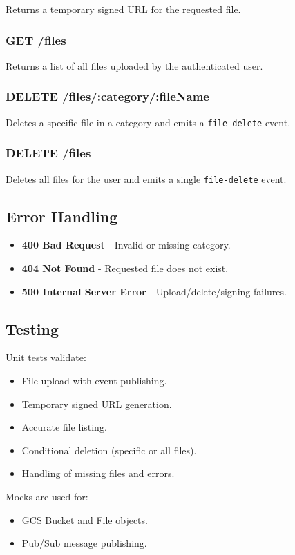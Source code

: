 Returns a temporary signed URL for the requested file.

\subsubsection*{GET /files}

Returns a list of all files uploaded by the authenticated user.

\subsubsection*{DELETE /files/:category/:fileName}

Deletes a specific file in a category and emits a \texttt{file-delete} event.

\subsubsection*{DELETE /files}

Deletes all files for the user and emits a single \texttt{file-delete} event.

\subsection*{Error Handling}

\begin{itemize}
    \item \textbf{400 Bad Request} - Invalid or missing category.
    \item \textbf{404 Not Found} - Requested file does not exist.
    \item \textbf{500 Internal Server Error} - Upload/delete/signing failures.
\end{itemize}

\subsection*{Testing}

Unit tests validate:

\begin{itemize}
    \item File upload with event publishing.
    \item Temporary signed URL generation.
    \item Accurate file listing.
    \item Conditional deletion (specific or all files).
    \item Handling of missing files and errors.
\end{itemize}

Mocks are used for:

\begin{itemize}
    \item GCS Bucket and File objects.
    \item Pub/Sub message publishing.
\end{itemize}
